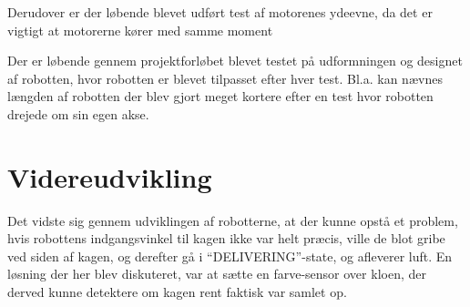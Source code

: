Derudover er der løbende blevet udført test af motorenes ydeevne, da det er vigtigt at motorerne kører med samme moment

Der er løbende gennem projektforløbet blevet testet på udformningen og designet af robotten, hvor robotten er blevet tilpasset efter hver test. Bl.a. kan nævnes længden af robotten der blev gjort meget kortere efter en test hvor robotten drejede om sin egen akse.

\section{Videreudvikling}
Det vidste sig gennem udviklingen af robotterne, at der kunne opstå et problem, hvis robottens indgangsvinkel til kagen ikke var helt præcis, ville de blot gribe ved siden af kagen, og derefter gå i "`DELIVERING"'-state, og afleverer luft. En løsning der her blev diskuteret, var at sætte en farve-sensor over kloen, der derved kunne detektere om kagen rent faktisk var samlet op.

